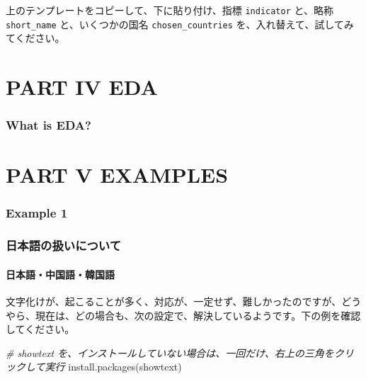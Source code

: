 \documentclass[
]{bxjsbook}
\newenvironment{Shaded}{\begin{snugshade}}{\end{snugshade}}
\newcommand{\CommentTok}[1]{\textcolor[rgb]{0.56,0.35,0.01}{\textit{#1}}}
\newcommand{\FunctionTok}[1]{\textcolor[rgb]{0.00,0.00,0.00}{#1}}
\newcommand{\NormalTok}[1]{#1}
\newcommand{\StringTok}[1]{\textcolor[rgb]{0.31,0.60,0.02}{#1}}
\theoremstyle{definition}
\theoremstyle{definition}
\theoremstyle{definition}
\theoremstyle{definition}
\theoremstyle{remark}
\begin{document}
上のテンプレートをコピーして、下に貼り付け、指標 \texttt{indicator} と、略称 \texttt{short\_name} と、いくつかの国名 \texttt{chosen\_countries} を、入れ替えて、試してみてください。

\hypertarget{part-part-iv-eda}{%
\part{PART IV EDA}\label{part-part-iv-eda}}

\hypertarget{intro2eda}{%
\section{What is EDA?}\label{intro2eda}}

\hypertarget{part-part-v-examples}{%
\part{PART V EXAMPLES}\label{part-part-v-examples}}

\hypertarget{example1}{%
\section{Example 1}\label{example1}}

\hypertarget{appendix-appendix}{%
\appendix}


\hypertarget{japanese}{%
\section{日本語の扱いについて}\label{japanese}}

\hypertarget{ux65e5ux672cux8a9eux4e2dux56fdux8a9eux97d3ux56fdux8a9e}{%
\subsection{日本語・中国語・韓国語}\label{ux65e5ux672cux8a9eux4e2dux56fdux8a9eux97d3ux56fdux8a9e}}

文字化けが、起こることが多く、対応が、一定せず、難しかったのですが、どうやら、現在は、どの場合も、次の設定で、解決しているようです。下の例を確認してください。

\begin{Shaded}
\begin{Highlighting}[]
\CommentTok{\# showtext を、インストールしていない場合は、一回だけ、右上の三角をクリックして実行}
\FunctionTok{install.packages}\NormalTok{(}\StringTok{\textquotesingle{}showtext\textquotesingle{}}\NormalTok{)}
\end{Highlighting}
\end{Shaded}
\end{document}
